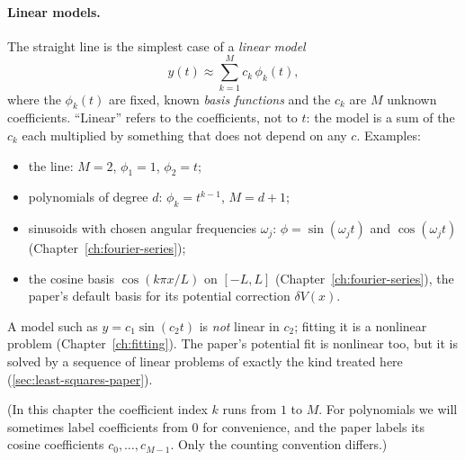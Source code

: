 \paragraph{Linear models.} The straight line is the simplest case of a \emph{linear model}
\begin{equation}
y(t) \approx \sum_{k=1}^{M} c_k\,\phi_k(t),
\label{eq:least-squares-model}
\end{equation}
where the $\phi_k(t)$ are fixed, known \emph{basis functions} and the $c_k$ are $M$ unknown coefficients. ``Linear'' refers to the coefficients, not to $t$: the model is a sum of the $c_k$ each multiplied by something that does not depend on any $c$. Examples:
\begin{itemize}
\item the line: $M=2$, $\phi_1 = 1$, $\phi_2 = t$;
\item polynomials of degree $d$: $\phi_k = t^{k-1}$, $M = d+1$;
\item sinusoids with chosen angular frequencies $\omega_j$: $\phi = \sin(\omega_j t)$ and $\cos(\omega_j t)$ (Chapter~\ref{ch:fourier-series});
\item the cosine basis $\cos(k\pi x/L)$ on $[-L,L]$ (Chapter~\ref{ch:fourier-series}), the paper's default basis for its potential correction $\delta V(x)$.
\end{itemize}
A model such as $y = c_1\sin(c_2 t)$ is \emph{not} linear in $c_2$; fitting it is a nonlinear problem (Chapter~\ref{ch:fitting}). The paper's potential fit is nonlinear too, but it is solved by a sequence of linear problems of exactly the kind treated here (\cref{sec:least-squares-paper}).

(In this chapter the coefficient index $k$ runs from $1$ to $M$. For polynomials we will sometimes label coefficients from $0$ for convenience, and the paper labels its cosine coefficients $c_0,\dots,c_{M-1}$. Only the counting convention differs.)

